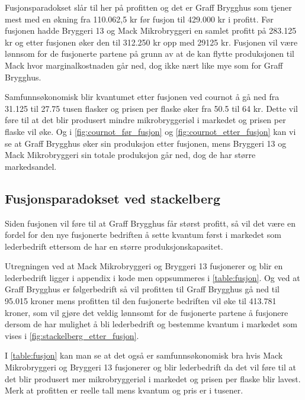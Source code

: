 \documentclass[
  12pt,
  a4paper,
  DIV=11,
  numbers=noendperiod]{scrartcl}
\begin{document}
Fusjonsparadokset slår til her på profitten og det er Graff Brygghus som
tjener mest med en økning fra 110.062,5 kr før fusjon til 429.000 kr i
profitt. Før fusjonen hadde Bryggeri 13 og Mack Mikrobryggeri en samlet
profitt på 283.125 kr og etter fusjonen øker den til 312.250 kr opp med
29125 kr. Fusjonen vil være lønnsom for de fusjonerte partene på grunn
av at de kan flytte produksjonen til Mack hvor marginalkostnaden går
ned, dog ikke nært like mye som for Graff Brygghus.

Samfunnsøkonomisk blir kvantumet etter fusjonen ved cournot å gå ned fra
31.125 til 27.75 tusen flasker og prisen per flaske øker fra 50.5 til 64
kr. Dette vil føre til at det blir produsert mindre mikrobryggeriøl i
markedet og prisen per flaske vil øke. Og i
\autoref{fig:cournot_før_fusjon} og \autoref{fig:cournot_etter_fusjon}
kan vi se at Graff Brygghus øker sin produksjon etter fusjonen, mens
Bryggeri 13 og Mack Mikrobryggeri sin totale produksjon går ned, dog de
har større markedsandel.

\subsection{Fusjonsparadokset ved
stackelberg}\label{fusjonsparadokset-ved-stackelberg}

Siden fusjonen vil føre til at Graff Brygghus får størst profitt, så vil
det være en fordel for den nye fusjonerte bedriften å sette kvantum
først i markedet som lederbedrift ettersom de har en større
produksjonskapasitet.

Utregningen ved at Mack Mikrobryggeri og Bryggeri 13 fusjonerer og blir
en lederbedrift ligger i appendix i kode men oppsummeres i
\autoref{table:fusjon}. Og ved at Graff Brygghus er følgerbedrift så vil
profitten til Graff Brygghus gå ned til 95.015 kroner mens profitten til
den fusjonerte bedriften vil øke til 413.781 kroner, som vil gjøre det
veldig lønnsomt for de fusjonerte partene å fusjonere dersom de har
mulighet å bli lederbedrift og bestemme kvantum i markedet som vises i
\autoref{fig:stackelberg_etter_fusjon}.

\clearpage

I \autoref{table:fusjon} kan man se at det også er samfunnsøkonomisk bra
hvis Mack Mikrobryggeri og Bryggeri 13 fusjonerer og blir lederbedrift
da det vil føre til at det blir produsert mer mikrobryggeriøl i markedet
og prisen per flaske blir lavest. Merk at profitten er reelle tall mens
kvantum og pris er i tusener.
\end{document}
